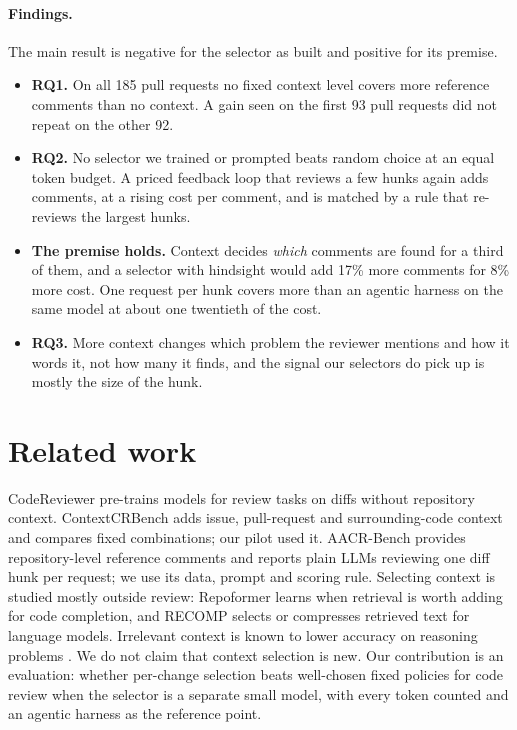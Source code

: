 \documentclass{article}
\begin{document}
\paragraph{Findings.} The main result is negative for the selector as built and positive for its premise.
\begin{itemize}
\item \textbf{RQ1.} On all 185 pull requests no fixed context level covers more reference comments than no context. A gain seen on the first 93 pull requests did not repeat on the other 92.
\item \textbf{RQ2.} No selector we trained or prompted beats random choice at an equal token budget. A priced feedback loop that reviews a few hunks again adds comments, at a rising cost per comment, and is matched by a rule that re-reviews the largest hunks.
\item \textbf{The premise holds.} Context decides \emph{which} comments are found for a third of them, and a selector with hindsight would add 17\% more comments for 8\% more cost. One request per hunk covers more than an agentic harness on the same model at about one twentieth of the cost.
\item \textbf{RQ3.} More context changes which problem the reviewer mentions and how it words it, not how many it finds, and the signal our selectors do pick up is mostly the size of the hunk.
\end{itemize}

\section{Related work}
CodeReviewer \citep{li2022codereviewer} pre-trains models for review tasks on diffs without repository context. ContextCRBench \citep{hu2025contextcrbench} adds issue, pull-request and surrounding-code context and compares fixed combinations; our pilot used it. AACR-Bench \citep{zhang2026aacr} provides repository-level reference comments and reports plain LLMs reviewing one diff hunk per request; we use its data, prompt and scoring rule. Selecting context is studied mostly outside review: Repoformer \citep{wu2024repoformer} learns when retrieval is worth adding for code completion, and RECOMP \citep{xu2023recomp} selects or compresses retrieved text for language models. Irrelevant context is known to lower accuracy on reasoning problems \citep{shi2023distracted}. We do not claim that context selection is new. Our contribution is an evaluation: whether per-change selection beats well-chosen fixed policies for code review when the selector is a separate small model, with every token counted and an agentic harness \citep{openai2026codex} as the reference point.
\end{document}
